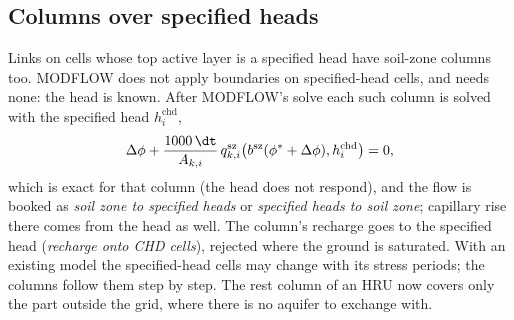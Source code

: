 \subsection{Columns over specified heads}\label{sec:szchd}
Links on cells whose top active layer is a specified head have soil-zone columns too. MODFLOW does not apply
boundaries on specified-head cells, and needs none: the head is known. After MODFLOW's solve each such column is
solved with the specified head $h^{\mathrm{chd}}_i$,
\begin{equation}
\Delta\phi+\frac{1000\,\dt}{A_{k,i}}\,q^{\mathrm{sz}}_{k,i}\big(b^{\mathrm{sz}}(\phi^*+\Delta\phi),h^{\mathrm{chd}}_i\big)=0,
\end{equation}
which is exact for that column (the head does not respond), and the flow is booked as \emph{soil zone to specified
heads} or \emph{specified heads to soil zone}; capillary rise there comes from the head as well. The column's recharge
goes to the specified head (\emph{recharge onto CHD cells}), rejected where the ground is saturated. With an existing
model the specified-head cells may change with its stress periods; the columns follow them step by step. The rest
column of an HRU now covers only the part outside the grid, where there is no aquifer to exchange with.

